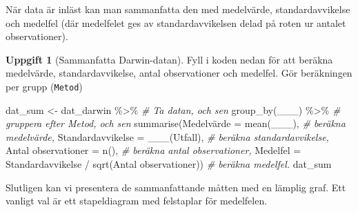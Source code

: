 \documentclass[
]{book}
\newenvironment{Shaded}{\begin{snugshade}}{\end{snugshade}}
\newcommand{\AttributeTok}[1]{\textcolor[rgb]{0.77,0.63,0.00}{#1}}
\newcommand{\CommentTok}[1]{\textcolor[rgb]{0.56,0.35,0.01}{\textit{#1}}}
\newcommand{\FunctionTok}[1]{\textcolor[rgb]{0.00,0.00,0.00}{#1}}
\newcommand{\NormalTok}[1]{#1}
\newcommand{\OtherTok}[1]{\textcolor[rgb]{0.56,0.35,0.01}{#1}}
\newcommand{\SpecialCharTok}[1]{\textcolor[rgb]{0.00,0.00,0.00}{#1}}
\newcommand{\StringTok}[1]{\textcolor[rgb]{0.31,0.60,0.02}{#1}}
\theoremstyle{definition}
\theoremstyle{definition}
\theoremstyle{definition}
\newtheorem{exercise}{Uppgift}[chapter]
\theoremstyle{definition}
\theoremstyle{remark}
\begin{document}
När data är inläst kan man sammanfatta den med medelvärde, standardavvikelse och medelfel (där medelfelet ges av standardavvikelsen delad på roten ur antalet observationer).

\begin{exercise}[Sammanfatta Darwin-datan]

Fyll i koden nedan för att beräkna medelvärde, standardavvikelse, antal observationer och medelfel. Gör beräkningen per grupp (\texttt{Metod})

\begin{Shaded}
\begin{Highlighting}[]
\NormalTok{dat\_sum }\OtherTok{\textless{}{-}}\NormalTok{ dat\_darwin }\SpecialCharTok{\%\textgreater{}\%}                                                 \CommentTok{\# Ta datan, och sen}
  \FunctionTok{group\_by}\NormalTok{(\_\_\_) }\SpecialCharTok{\%\textgreater{}\%}                                                       \CommentTok{\# gruppera efter Metod, och sen}
  \FunctionTok{summarise}\NormalTok{(Medelvärde }\OtherTok{=} \FunctionTok{mean}\NormalTok{(\_\_\_),                                       }\CommentTok{\# beräkna medelvärde,}
            \AttributeTok{Standardavvikelse =} \FunctionTok{\_\_\_}\NormalTok{(Utfall),                              }\CommentTok{\# beräkna standardavvikelse,}
            \StringTok{\textasciigrave{}}\AttributeTok{Antal observationer}\StringTok{\textasciigrave{}} \OtherTok{=} \FunctionTok{n}\NormalTok{(),                                  }\CommentTok{\# beräkna antal observationer,}
            \AttributeTok{Medelfel =}\NormalTok{ Standardavvikelse }\SpecialCharTok{/} \FunctionTok{sqrt}\NormalTok{(}\StringTok{\textasciigrave{}}\AttributeTok{Antal observationer}\StringTok{\textasciigrave{}}\NormalTok{))   }\CommentTok{\# beräkna medelfel.}
\NormalTok{dat\_sum}
\end{Highlighting}
\end{Shaded}

\end{exercise}

Slutligen kan vi presentera de sammanfattande måtten med en lämplig graf. Ett vanligt val är ett stapeldiagram med felstaplar för medelfelen.
\end{document}
